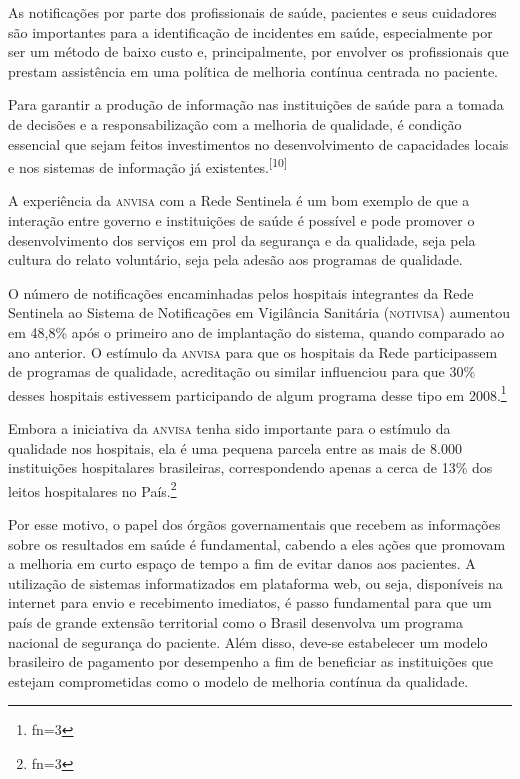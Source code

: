 \documentclass{article}
\makeatletter
\newcommand{\fn}{\afterassignment\fn@aux\count0=}
\newcommand{\fn@aux}{\csname fn\the\count0\endcsname}
\makeatother
\begin{document}
As notificações por parte dos profissionais de saúde, pacientes e seus
cuidadores são
importantes para a identificação de incidentes em saúde, especialmente por ser
um método de
baixo custo e, principalmente, por envolver os profissionais que prestam
assistência em uma
política de melhoria contínua centrada no paciente.

Para garantir a produção de informação nas instituições de saúde para a tomada
de decisões
e a responsabilização com a melhoria de qualidade, é condição essencial que
sejam feitos
investimentos no desenvolvimento de capacidades locais e nos sistemas de
informação já
existentes.\textsuperscript{[}\textsuperscript{10}\textsuperscript{]}

A experiência da \textsc{anvisa} com a Rede Sentinela é um bom exemplo de que a interação
entre
governo e instituições de saúde é possível e pode promover o desenvolvimento dos
serviços em
prol da segurança e da qualidade, seja pela cultura do relato voluntário, seja
pela adesão
aos programas de qualidade.

O número de notificações encaminhadas pelos hospitais integrantes da Rede
Sentinela ao
Sistema de Notificações em Vigilância Sanitária (\textsc{notivisa}) aumentou em 48,8\%
após o primeiro
ano de implantação do sistema, quando comparado ao ano anterior. O estímulo da
\textsc{anvisa} para
que os hospitais da Rede participassem de programas de qualidade, acreditação ou
similar
influenciou para que 30\% desses hospitais estivessem participando de algum
programa desse
tipo em 2008.\footnote{\fn3}

Embora a iniciativa da \textsc{anvisa} tenha sido importante para o estímulo da qualidade
nos
hospitais, ela é uma pequena parcela entre as mais de 8.000 instituições
hospitalares
brasileiras, correspondendo apenas a cerca de 13\% dos leitos hospitalares no
País.\footnote{\fn3}

Por esse motivo, o papel dos órgãos governamentais que recebem as informações
sobre os
resultados em saúde é fundamental, cabendo a eles ações que promovam a melhoria
em curto
espaço de tempo a fim de evitar danos aos pacientes. A utilização de sistemas
informatizados
em plataforma web, ou seja, disponíveis na internet para envio e recebimento
imediatos, é
passo fundamental para que um país de grande extensão territorial como o Brasil
desenvolva
um programa nacional de segurança do paciente. Além disso, deve-se estabelecer
um modelo
brasileiro de pagamento por desempenho a fim de beneficiar as instituições que
estejam
comprometidas como o modelo de melhoria contínua da qualidade.
\end{document}
